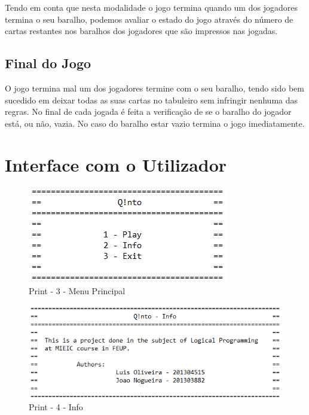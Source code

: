 \documentclass[a4paper]{article}
\begin{document}
	Tendo em conta que nesta modalidade o jogo termina quando um dos jogadores termina o seu baralho, podemos avaliar o estado do jogo através do número de cartas restantes nos baralhos dos jogadores que são impressos nas jogadas.

	\subsection{Final do Jogo}

	O jogo termina mal um dos jogadores termine com o seu baralho, tendo sido bem sucedido em deixar todas as suas cartas no tabuleiro sem infringir nenhuma das regras. No final de cada jogada é feita a verificação de se o baralho do jogador está, ou não, vazia. No caso do baralho estar vazio termina o jogo imediatamente.
	
	\lstset{  title=Código - 7}
	


	\newpage

	\section{Interface com o Utilizador}

	\begin{figure}[ht!]
	\centering
	\includegraphics[scale = 1]{./res/print5.png}
	\caption{Print - 3 -  Menu Principal \label{Print - 3}}
	\end{figure}

	\begin{figure}[ht!]
	\centering
	\includegraphics[scale = 1]{./res/print6.png}
	\caption{Print - 4 -  Info \label{Print - 4}}
	\end{figure}
\end{document}
